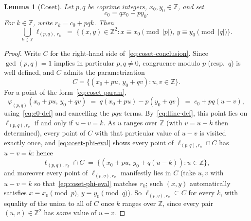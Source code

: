 \documentclass[a4paper,11pt,oneside,reqno]{amsart}
\theoremstyle{definition}
\theoremstyle{remark}
\theoremstyle{plain}
\newtheorem{lemma}[definition]{Lemma}
\newcommand{\Z}{\mathbb{Z}}
\begin{document}
\begin{lemma}[Coset]
  \label{lem:coset}
  Let \(p,q\) be coprime integers, \(x_0,y_0\in\Z\), and set
  \begin{equation}
    \label{eq:c0-def}
    c_0 = qx_0-py_0.
  \end{equation}
  For \(k\in\Z\), write \(r_k=c_0+pqk\). Then
  \begin{equation}
    \label{eq:coset-conclusion}
    \bigcup_{k\in\Z} \ell_{(p,q),\,r_k} \;=\; \{(x,y)\in\Z^2 : x\equiv x_0\!\!\pmod{|p|},\
    y\equiv y_0\!\!\pmod{|q|}\}.
  \end{equation}
\end{lemma}

\begin{proof}
  Write \(C\) for the right-hand side of~\eqref{eq:coset-conclusion}. Since \(\gcd(p,q)=1\) implies in
  particular \(p,q\ne0\), congruence modulo \(p\) (resp.\ \(q\)) is well defined, and \(C\) admits the
  parametrization
  \begin{equation}
    \label{eq:coset-param}
    C = \{(x_0+pu,\,y_0+qv) : u,v\in\Z\}.
  \end{equation}
  For a point of the form~\eqref{eq:coset-param},
  \begin{equation}
    \label{eq:coset-phi-eval}
    \varphi_{(p,q)}(x_0+pu,\,y_0+qv) \;=\; q(x_0+pu)-p(y_0+qv) \;=\; c_0 + pq(u-v),
  \end{equation}
  using~\eqref{eq:c0-def} and cancelling the \(pqu\) terms. By~\eqref{eq:lline-def}, this point lies
  on \(\ell_{(p,q),r_k}\) if and only if \(u-v=k\). As \(u\) ranges over \(\Z\) (with \(v=u-k\) then
  determined), every point of \(C\) with that particular value of \(u-v\) is visited exactly once, and
  \eqref{eq:coset-phi-eval} shows every point of \(\ell_{(p,q),r_k}\cap C\) has \(u-v=k\): hence
  \begin{equation}
    \label{eq:coset-single-level}
    \ell_{(p,q),\,r_k} \cap C \;=\; \{(x_0+pu,\,y_0+q(u-k)) : u\in\Z\},
  \end{equation}
  and moreover every point of \(\ell_{(p,q),r_k}\) manifestly lies in \(C\) (take \(u,v\) with
  \(u-v=k\) so that~\eqref{eq:coset-phi-eval} matches \(r_k\); such \((x,y)\) automatically satisfies
  \(x\equiv x_0\pmod p\), \(y\equiv y_0\pmod q\)). So \(\ell_{(p,q),r_k}\subseteq C\) for every \(k\),
  with equality of the union to all of \(C\) once \(k\) ranges over \(\Z\), since every pair \((u,v)\in\Z^2\)
  has \emph{some} value of \(u-v\).
\end{proof}
\end{document}
